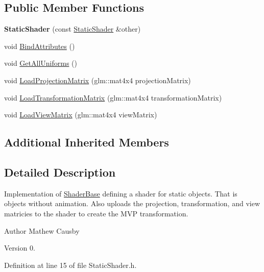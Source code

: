 \subsection*{Public Member Functions}
\begin{DoxyCompactItemize}
\item 
\mbox{\label{class_shaders_1_1_static_shader_a133b2935aef11a9e51bf2589a1400f4b}} 
{\bfseries Static\+Shader} (const \hyperlink{class_shaders_1_1_static_shader}{Static\+Shader} \&other)
\item 
void \hyperlink{class_shaders_1_1_static_shader_a4ba0a1e7a4d2b58668f97cb9e3892f57}{Bind\+Attributes} ()
\item 
void \hyperlink{class_shaders_1_1_static_shader_a2417ca33a617fe8a8cb30ec3b5e866fa}{Get\+All\+Uniforms} ()
\item 
void \hyperlink{class_shaders_1_1_static_shader_a7133b5436145e2769cb940835e59a5f7}{Load\+Projection\+Matrix} (glm\+::mat4x4 projection\+Matrix)
\item 
void \hyperlink{class_shaders_1_1_static_shader_ab0241a6caf6b7a9fe48b35da63a1cefb}{Load\+Transformation\+Matrix} (glm\+::mat4x4 transformation\+Matrix)
\item 
void \hyperlink{class_shaders_1_1_static_shader_aacb252f60950b03d3aa0dc0abc92d768}{Load\+View\+Matrix} (glm\+::mat4x4 view\+Matrix)
\end{DoxyCompactItemize}
\subsection*{Additional Inherited Members}


\subsection{Detailed Description}
Implementation of \hyperlink{class_shaders_1_1_shader_base}{Shader\+Base} defining a shader for static objects. That is objects without animation. Also uploads the projection, transformation, and view matricies to the shader to create the M\+VP transformation. \begin{DoxyAuthor}{Author}
Mathew Causby 
\end{DoxyAuthor}
\begin{DoxyVersion}{Version}
0. 
\end{DoxyVersion}


Definition at line 15 of file Static\+Shader.\+h.



